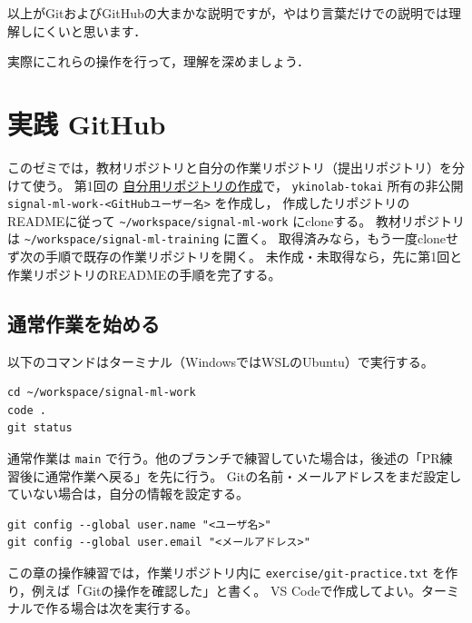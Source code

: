 以上がGitおよびGitHubの大まかな説明ですが，やはり言葉だけでの説明では理解しにくいと思います．

実際にこれらの操作を行って，理解を深めましょう．


\hypertarget{ux5b9fux8df5-github}{%
\section{実践 GitHub}\label{ux5b9fux8df5-github}}

このゼミでは，教材リポジトリと自分の作業リポジトリ（提出リポジトリ）を分けて使う。 第1回の
\href{https://github.com/ykinolab-tokai/signal-ml-training/blob/main/handouts/01-environment-and-workflow.md\#自分用リポジトリの作成}{自分用リポジトリの作成}で，
\texttt{ykinolab-tokai} 所有の非公開
\texttt{signal-ml-work-\textless{}GitHubユーザー名\textgreater{}}
を作成し， 作成したリポジトリのREADMEに従って
\texttt{\textasciitilde{}/workspace/signal-ml-work} にcloneする。
教材リポジトリは \texttt{\textasciitilde{}/workspace/signal-ml-training}
に置く。 取得済みなら，もう一度cloneせず次の手順で既存の作業リポジトリを開く。
未作成・未取得なら，先に第1回と作業リポジトリのREADMEの手順を完了する。

\hypertarget{ux901aux5e38ux4f5cux696dux3092ux59cbux3081ux308b}{%
\subsection{通常作業を始める}\label{ux901aux5e38ux4f5cux696dux3092ux59cbux3081ux308b}}

以下のコマンドはターミナル（WindowsではWSLのUbuntu）で実行する。

\begin{lstlisting}[style=codecell]
cd ~/workspace/signal-ml-work
code .
git status
\end{lstlisting}

通常作業は \texttt{main}
で行う。他のブランチで練習していた場合は，後述の「PR練習後に通常作業へ戻る」を先に行う。
Gitの名前・メールアドレスをまだ設定していない場合は，自分の情報を設定する。

\begin{lstlisting}[style=codecell]
git config --global user.name "<ユーザ名>"
git config --global user.email "<メールアドレス>"
\end{lstlisting}

この章の操作練習では，作業リポジトリ内に \texttt{exercise/git-practice.txt}
を作り，例えば「Gitの操作を確認した」と書く。 VS
Codeで作成してよい。ターミナルで作る場合は次を実行する。

